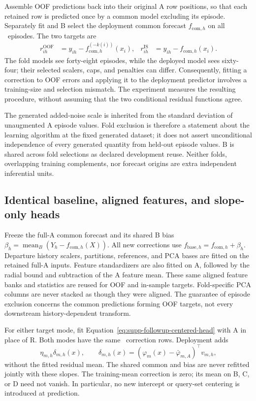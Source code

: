 Assemble OOF predictions back into their original A row positions, so that
each retained row is predicted once by a common model excluding its episode.
Separately fit and B select the deployment common forecast
$f_{\mathrm{com},h}$ on all \CFREpisodesA\ episodes. The two targets are
\begin{align}
 r^{\mathrm{OOF}}_{ih}
   &=y_{ih}-f_{\mathrm{com},h}^{(-k(i))}(x_i),
 &r^{\mathrm{IS}}_{ih}
   &=y_{ih}-f_{\mathrm{com},h}(x_i).
 \label{eq:supp-crossfit-targets}
\end{align}
The fold models see forty-eight episodes, while the deployed model sees
sixty-four; their selected scalers, caps, and penalties can differ.
Consequently, fitting a correction to OOF errors and applying it to the
deployment predictor involves a training-size and selection mismatch.
The experiment measures the resulting procedure, without assuming that
the two conditional residual functions agree.

The generated added-noise scale is inherited from the standard deviation
of unaugmented A episode values. Fold exclusion is therefore a statement
about the learning algorithm at the fixed generated dataset; it does not
assert unconditional independence of every generated quantity from
held-out episode values. B is shared across fold selections as declared
development reuse. Neither folds, overlapping training complements, nor
forecast origins are extra independent inferential units.

\subsection{Identical baseline, aligned features, and slope-only heads}

Freeze the full-A common forecast and its shared B bias
$\beta_h=\operatorname{mean}_B(Y_h-f_{\mathrm{com},h}(X))$.
All new corrections use
$f_{\mathrm{base},h}=f_{\mathrm{com},h}+\beta_h$.
Departure history scalers, partitions, references, and PCA bases are
fitted on the retained full-A inputs. Feature standardizers are also
fitted on A, followed by the radial bound and subtraction of the A feature
mean. These same aligned feature banks and statistics are reused for
OOF and in-sample targets. Fold-specific PCA columns are never stacked as
though they were aligned. The guarantee of episode exclusion concerns
the common predictions forming OOF targets, not every downstream
history-dependent transform.

For either target mode, fit Equation~\eqref{eq:supp-followup-centered-head}
with A in place of R. Both modes have the same \CFRRowsA\ correction
rows. Deployment adds
\[
 \eta_{m,h}\delta_{m,h}(x),\qquad
 \delta_{m,h}(x)=(\varphi_m(x)-\bar\varphi_{m,A})^\top v_{m,h},
\]
without the fitted residual mean. The shared common and bias are never
refitted jointly with these slopes. The training-mean correction is zero;
its mean on B, C, or D need not vanish. In particular, no new intercept
or query-set centering is introduced at prediction.

